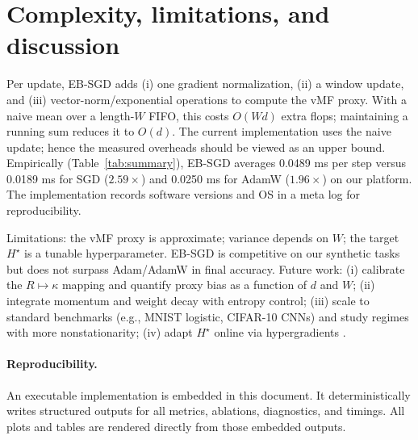 \section{Complexity, limitations, and discussion}
Per update, EB-SGD adds (i) one gradient normalization, (ii) a window update, and (iii) vector-norm/exponential operations to compute the vMF proxy. With a naive mean over a length-$W$ FIFO, this costs $O(Wd)$ extra flops; maintaining a running sum reduces it to $O(d)$. The current implementation uses the naive update; hence the measured overheads should be viewed as an upper bound. Empirically (Table~\ref{tab:summary}), EB-SGD averages 0.0489 ms per step versus 0.0189 ms for SGD ($2.59\times$) and 0.0250 ms for AdamW ($1.96\times$) on our platform. The implementation records software versions and OS in a meta log for reproducibility.

Limitations: the vMF proxy is approximate; variance depends on $W$; the target $H^\star$ is a tunable hyperparameter. EB-SGD is competitive on our synthetic tasks but does not surpass Adam/AdamW in final accuracy. Future work: (i) calibrate the $R\mapsto\kappa$ mapping and quantify proxy bias as a function of $d$ and $W$; (ii) integrate momentum and weight decay with entropy control; (iii) scale to standard benchmarks (e.g., MNIST logistic, CIFAR-10 CNNs) and study regimes with more nonstationarity; (iv) adapt $H^\star$ online via hypergradients \cite{Baydin2018HypergradientICLR}.

\paragraph{Reproducibility.}
An executable implementation is embedded in this document. It deterministically writes structured outputs for all metrics, ablations, diagnostics, and timings. All plots and tables are rendered directly from those embedded outputs.

